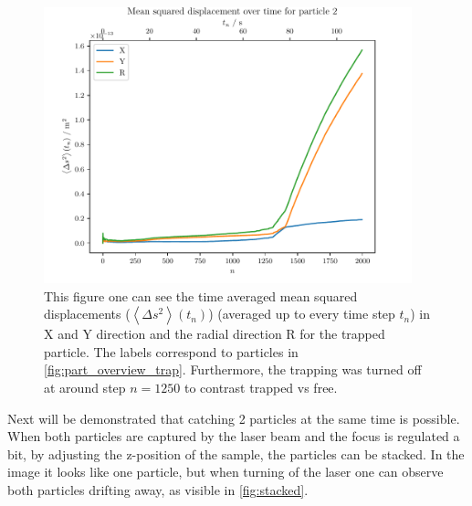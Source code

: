 \documentclass[12pt,english]{scrartcl}
\begin{document}
\begin{figure}[H]
	\centering
	\includegraphics[width=0.95\textwidth]{figures/III_particle_trapped.pdf}
	\caption[Time averaged mean squared displacements of trapped particle]{This figure one
		can see the time averaged mean squared displacements ($\left\langle \Delta s^2
			\right\rangle(t_n)$) (averaged up to every time step $t_n$) in X and Y
		direction and the radial direction R for the trapped particle. The labels
		correspond to particles in \autoref{fig:part_overview_trap}. Furthermore, the
		trapping was turned off at around step $n=1250$ to contrast trapped vs free.
	}\label{fig:part_trapped}
\end{figure}

Next will be demonstrated that catching 2 particles at the same time is
possible. When both particles are captured by the laser beam and the focus is
regulated a bit, by adjusting the z-position of the sample, the particles can
be stacked. In the image it looks like one particle, but when turning of the
laser one can observe both particles drifting away, as visible in
\autoref{fig:stacked}.
\end{document}
